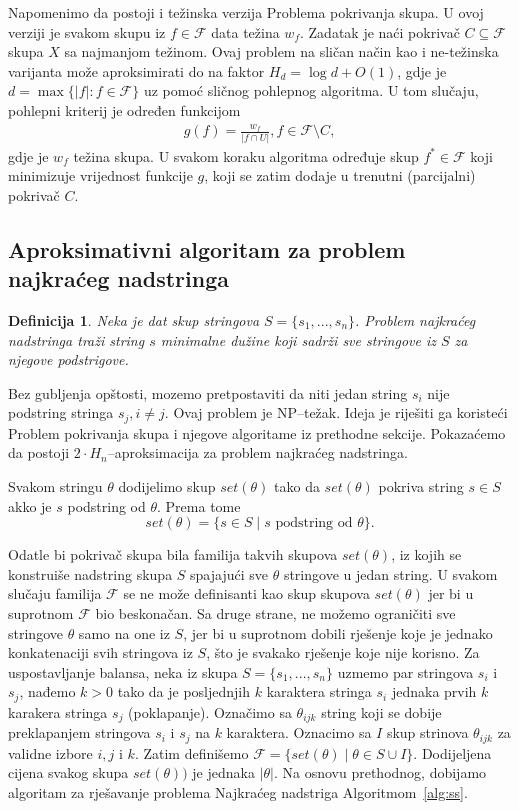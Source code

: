 \documentclass[a4paper, utf8, 11pt, colorlinks]{book}
\newtheorem{definition}{Definicija}
\begin{document}
Napomenimo da postoji i težinska verzija Problema pokrivanja skupa. U ovoj verziji je svakom skupu iz $f \in\mathcal{F}$ data težina $w_f$. Zadatak je naći pokrivač $C \subseteq \mathcal{F}$ skupa $X$ sa najmanjom težinom. Ovaj problem na sličan način kao i ne-težinska varijanta može aproksimirati do na faktor $H_d= \log d+O(1)$, gdje je $d= \max\{|f|:f \in \mathcal{F}\}$ uz pomoć sličnog pohlepnog algoritma. U tom slučaju, pohlepni kriterij je određen funkcijom 
\begin{align}
	g(f) = \frac{w_f}{|f \cap U|}, f \in \mathcal{F}\setminus C,
\end{align}
gdje je $w_f$ težina skupa. U svakom koraku algoritma određuje skup $f^* \in \mathcal{F}$ koji minimizuje vrijednost funkcije $g$, koji se zatim dodaje u trenutni (parcijalni) pokrivač $C$.

\subsection{Aproksimativni algoritam za problem najkraćeg nadstringa}


\begin{definition}
   Neka je dat skup stringova $S=\{s_1,...,s_n\}$. Problem najkraćeg nadstringa traži string  $s$ minimalne dužine koji sadrži sve stringove iz $S$ za njegove podstrigove. 
  \end{definition}
Bez gubljenja opštosti, mozemo pretpostaviti da niti jedan string $s_i$ nije podstring stringa $s_j, i\neq j$.
Ovaj problem je NP--težak. Ideja je riješiti ga koristeći Problem pokrivanja skupa i 
njegove algoritame iz prethodne sekcije. Pokazaćemo da postoji $2\cdot H_n$--aproksimacija za problem najkraćeg nadstringa. 

 Svakom stringu $\theta$ dodijelimo skup $set(\theta)$ tako da   $set(\theta)$ pokriva string $s\in S$ akko 
je $s$ podstring od $\theta$. Prema tome 
$$set(\theta) = \{ s \in S \mid s \mbox{  podstring od }\theta \}.$$

 Odatle bi pokrivač skupa bila familija takvih skupova $set(\theta)$, iz kojih se konstruiše nadstring skupa $S$ spajajući sve $\theta$ stringove u jedan string. U svakom slučaju familija  $\mathcal{F}$ se ne može definisanti kao skup skupova $set(\theta)$ jer bi u suprotnom $\mathcal{F}$ bio beskonačan. Sa druge strane, ne možemo ograničiti sve stringove $\theta$ samo na one iz $S$, jer bi u suprotnom dobili rješenje koje je jednako konkatenaciji svih stringova iz $S$, što je svakako  rješenje koje nije korisno. Za uspostavljanje balansa, neka iz skupa $S=\{s_1,...,s_n\}$ uzmemo par stringova $s_i$ i $s_j$, nađemo $k>0$  tako da je posljednjih $k$ karaktera stringa $s_i$ jednaka prvih $k$ karakera stringa $s_j$ (poklapanje). Označimo sa $\theta_{ijk}$ string koji se 
dobije preklapanjem stringova $s_i$ i $s_j$ na $k$ karaktera. Oznacimo sa $I$ skup strinova $\theta_{ijk}$  za validne izbore $i,j$ i $k$. Zatim definišemo $\mathcal{F}=\{set(\theta) \mid  \theta \in S \cup I\}$. Dodijeljena cijena svakog skupa $set(\theta))$ je jednaka $|\theta|$. Na osnovu prethodnog, dobijamo algoritam za rješavanje problema Najkraćeg nadstriga Algoritmom~\ref{alg:ss}. 
\end{document}
